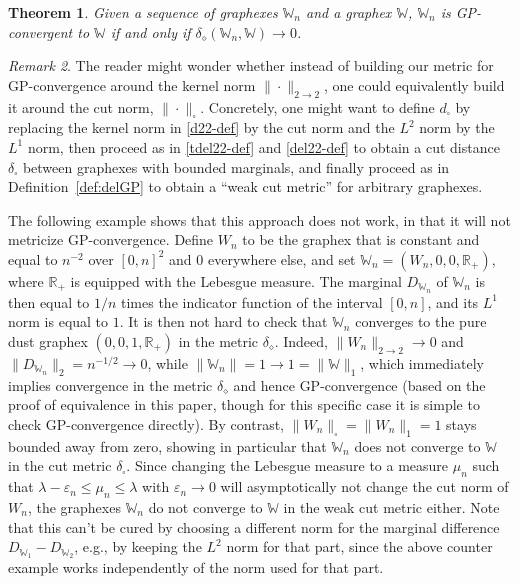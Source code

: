 \documentclass{amsart}
\numberwithin{equation}{section}
\numberwithin{figure}{section}
\newtheorem{theorem}{Theorem}[section]
\theoremstyle{definition}
\theoremstyle{remark}
\newtheorem{remark}[theorem]{Remark}
\newcommand{\eps}{\varepsilon}
\newcommand{\RR}{\mathbb{R}}
\newcommand{\cW}{\mathbb{W}}
\def\delGP{\delta_\diamond}
\begin{document}
\begin{theorem}\label{thm:delGP-GP}
Given a sequence of graphexes $\cW_n$ and a graphex $\cW$, $\cW_n$ is
GP-convergent to $\cW$ if and only if $\delGP(\cW_n,\cW) \rightarrow 0$.
\end{theorem}

\begin{remark}
The reader might wonder whether instead of building our metric for
GP-convergence around the kernel norm $\|\cdot\|_{2\to 2}$, one could
equivalently build it around the cut norm, $\|\cdot\|_{\square}$. Concretely,
one might want to define $d_\square$ by replacing the kernel norm in
\eqref{d22-def} by the cut norm and the $L^2$ norm by the $L^1$ norm, then
proceed as in \eqref{tdel22-def} and \eqref{del22-def} to obtain a cut
distance $\delta_\square$ between graphexes with bounded marginals, and
finally proceed as in Definition~\ref{def:delGP} to obtain a ``weak cut
metric'' for arbitrary graphexes.

The following example shows that this approach does not work, in that it will
not metricize GP-convergence. Define $W_n$ to be the graphex that is constant
and equal to $n^{-2}$ over $[0,n]^2$ and $0$ everywhere else, and set
$\cW_n=(W_n,0,0,\RR_+)$, where $\RR_+$ is equipped with the Lebesgue measure.
The marginal $D_{\cW_n}$ of $\cW_n$ is then equal to $1/n$ times the
indicator function of the interval $[0,n]$, and its $L^1$ norm is equal to
$1$. It is then not hard to check that $\cW_n$ converges to the pure dust
graphex $(0,0,1,\RR_+)$ in the metric $\delGP$. Indeed, $\|W_n\|_{2\to2}\to
0$ and $\|D_{\cW_n}\|_2=n^{-1/2}\to 0$, while $\|\cW_n\|=1\to 1=\|\cW\|_1$,
which immediately implies convergence in the metric $\delGP$ and hence
GP-convergence (based on the proof of equivalence in this paper, though for
this specific case it is simple to check GP-convergence directly). By
contrast, $\|W_n\|_\square =\|W_n\|_1 =1$ stays bounded away from zero,
showing in particular that $\cW_n$ does not converge to $\cW$ in the cut
metric $\delta_\square$. Since changing the Lebesgue measure to a measure
$\mu_n$ such that $\lambda-\eps_n\leq\mu_n\leq \lambda$ with $\eps_n \to0$
will asymptotically not change the cut norm of $W_n$, the graphexes $\cW_n$
do not converge to $\cW$ in the weak cut metric either. Note that this can't
be cured by choosing a different norm for the marginal difference
$D_{\cW_1}-D_{\cW_2}$, e.g., by keeping the $L^2$ norm for that part, since
the above counter example works independently of the norm used for that part.
\end{remark}
\end{document}

